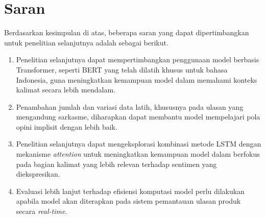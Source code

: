 \section{Saran}
Berdasarkan kesimpulan di atas, beberapa saran yang dapat
dipertimbangkan untuk penelitian selanjutnya adalah sebagai berikut.
\begin{enumerate}
  \item Penelitian selanjutnya dapat mempertimbangkan penggunaan
        model berbasis Transformer, seperti BERT yang telah
        dilatih khusus untuk bahasa Indonesia, guna meningkatkan
        kemampuan model dalam memahami konteks kalimat secara lebih
        mendalam.
  \item Penambahan jumlah dan variasi data latih, khususnya pada
        ulasan yang mengandung sarkasme, diharapkan dapat membantu
        model mempelajari pola opini implisit dengan lebih baik.
  \item Penelitian selanjutnya dapat mengeksplorasi kombinasi metode
        LSTM dengan mekanisme \textit{attention} untuk meningkatkan
        kemampuan model dalam berfokus pada bagian kalimat yang lebih
        relevan terhadap sentimen yang diekspresikan.
  \item Evaluasi lebih lanjut terhadap efisiensi komputasi model perlu
        dilakukan apabila model akan diterapkan pada sistem pemantauan
        ulasan produk secara \textit{real-time}.
\end{enumerate}
